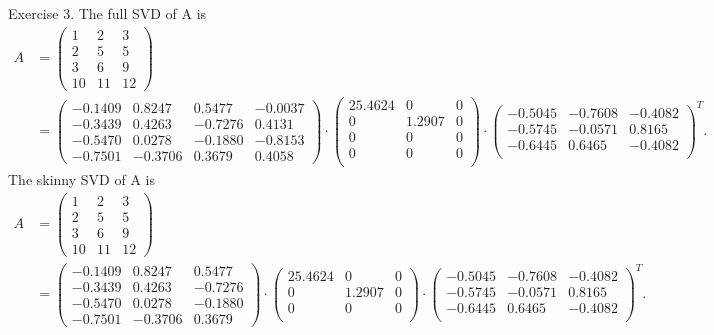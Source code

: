\documentclass{article}
\begin{document}
\begin{section}{Exercise 3.}
The full SVD of A is
\begin{align*}
A &=
\begin{pmatrix}
1 & 2 & 3\\
2 & 5 & 5\\
3 & 6 & 9\\
10 & 11 & 12
\end{pmatrix}
\\ 
&=
\begin{pmatrix}
   -0.1409  &  0.8247  &  0.5477  & -0.0037 \\
   -0.3439  &  0.4263 &  -0.7276  &  0.4131 \\
   -0.5470  &  0.0278 &  -0.1880  & -0.8153 \\
   -0.7501 &  -0.3706  &  0.3679 &   0.4058 
\end{pmatrix} 
\cdot
\begin{pmatrix}
   25.4624       &  0    &     0 \\
         0  &  1.2907    &     0\\
         0   &      0   &     0    \\
         0    &     0      &   0\\
\end{pmatrix}
\cdot
\begin{pmatrix}
   -0.5045  & -0.7608 &  -0.4082 \\
   -0.5745  & -0.0571  &  0.8165\\
   -0.6445  &  0.6465 &  -0.4082\\
\end{pmatrix}^T.
\end{align*}
The skinny SVD of A is
\begin{align*}
A &=
\begin{pmatrix}
1 & 2 & 3\\
2 & 5 & 5\\
3 & 6 & 9\\
10 & 11 & 12
\end{pmatrix}
\\ 
&=
\begin{pmatrix}
   -0.1409  &  0.8247  &  0.5477  \\
   -0.3439  &  0.4263 &  -0.7276  \\
   -0.5470  &  0.0278 &  -0.1880  \\
   -0.7501 &  -0.3706  &  0.3679
\end{pmatrix} 
\cdot
\begin{pmatrix}
   25.4624       &  0    &     0 \\
         0  &  1.2907    &     0\\
         0   &      0   &     0    \\
\end{pmatrix}
\cdot
\begin{pmatrix}
   -0.5045  & -0.7608 &  -0.4082 \\
   -0.5745  & -0.0571  &  0.8165\\
   -0.6445  &  0.6465 &  -0.4082\\
\end{pmatrix}^T.
\end{align*}
\end{section}
\end{document}
